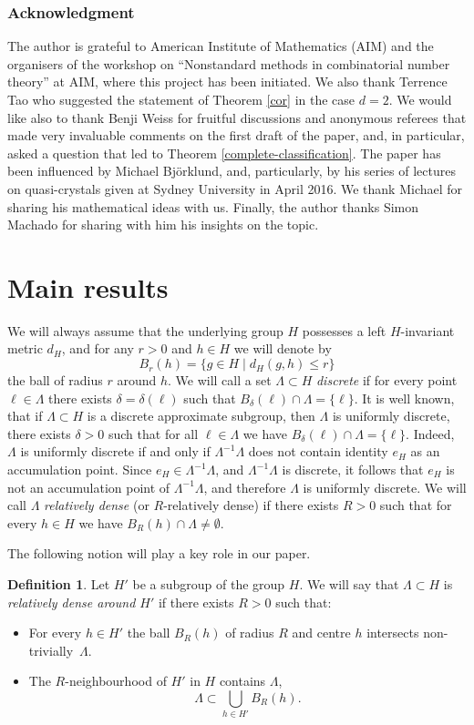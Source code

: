 \documentclass[10pt]{amsart}
\newcounter{dummy} \numberwithin{dummy}{section}
\theoremstyle{plain}
\theoremstyle{definition}
\newtheorem{mydef}[dummy]{Definition}
\begin{document}
\subsubsection*{Acknowledgment}
The author is grateful to American Institute of Mathematics (AIM) and the organisers of the workshop on ``Nonstandard methods in combinatorial number theory'' at AIM, where this project has been initiated. We also thank Terrence Tao who suggested the statement of Theorem \ref{cor} in the case $d = 2$. We would like also to thank Benji Weiss for fruitful discussions and anonymous referees that made very invaluable comments on the first draft of the paper, and, in particular, asked a question that led to Theorem \ref{complete-classification}. The paper has been influenced by Michael Björklund, and, particularly, by his series of lectures on quasi-crystals given at Sydney University in April 2016. We thank Michael for sharing his mathematical ideas with us. Finally, the author thanks Simon Machado for sharing with him his insights on the topic.

\section{Main results}
We will always assume that the underlying group $H$ possesses a left $H$-invariant metric $d_H$, and for any $r > 0$ and $h \in H$ we will denote by $$B_r(h) = \{ g \in H \mid d_H(g,h) \le r\}$$ the ball of radius $r$ around $h$. We will call a set $\Lambda \subset H$ \textit{discrete} if for every point $\ell \in \Lambda$ there exists $\delta = \delta(\ell)$ such that $B_{\delta}(\ell) \cap \Lambda = \{ \ell\}$. It is well known, that if $\Lambda \subset H$ is a discrete approximate subgroup, then $\Lambda$ is uniformly discrete, \ie there exists $\delta > 0$ such that for all $\ell \in \Lambda$ we have $B_{\delta}(\ell) \cap \Lambda = \{\ell\}$. Indeed, $\Lambda$ is uniformly discrete if and only if $\Lambda^{-1}\Lambda$ does not contain identity $e_H$ as an accumulation point.
Since $e_H \in \Lambda^{-1}\Lambda$, and $\Lambda^{-1}\Lambda$ is discrete, it follows that $e_H$ is not an accumulation point of $\Lambda^{-1}\Lambda$, and therefore $\Lambda$ is uniformly discrete. We will call $\Lambda$ \textit{relatively dense} (or $R$-relatively dense) if there exists $R > 0$ such that for every $h \in H$ we have $B_R(h) \cap \Lambda \neq \emptyset$.

The following notion will play a key role in our paper.

\begin{mydef}
\label{rel-dense-def}
Let $H'$ be a subgroup of the group $H$. We will say that $\Lambda \subset H$ is \textit{relatively dense around $H'$} if there exists $R > 0$ such that:
\begin{itemize}
\item For every $h\!\in\!H'$ the ball $B_{R}(h)$ of radius $R$ and centre $h$ intersects non-trivially~$\Lambda$.
\item The $R$-neighbourhood of $H'$ in $H$ contains $\Lambda$, \ie\vspace*{-3pt}
\[
\Lambda \subset \bigcup_{h \in H'} B_{R}(h).
\]
\end{itemize}
\end{mydef}
\end{document}
